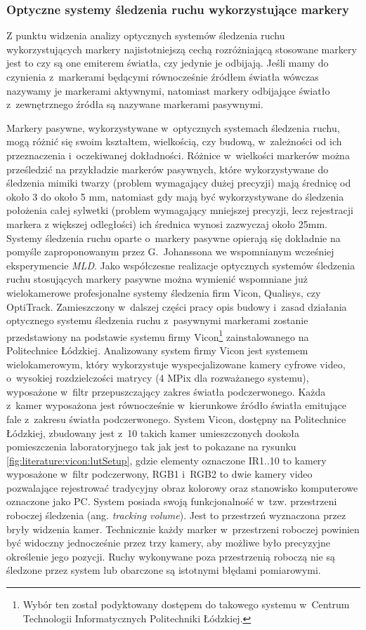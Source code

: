 \subsubsection*{Optyczne systemy śledzenia ruchu wykorzystujące markery}
Z punktu widzenia analizy optycznych systemów śledzenia ruchu wykorzystujących markery najistotniejszą cechą rozróżniającą stosowane markery jest to czy są one emiterem światła, czy jedynie je odbijają. Jeśli mamy do czynienia z~markerami będącymi równocześnie źródłem światła wówczas nazywamy je markerami aktywnymi, natomiast markery odbijające światło z~zewnętrznego źródła są nazywane markerami pasywnymi.

Markery pasywne, wykorzystywane w~optycznych systemach śledzenia ruchu, mogą różnić się swoim kształtem, wielkością, czy budową, w~zależności od ich przeznaczenia i~oczekiwanej dokładności. Różnice w~wielkości markerów można prześledzić na przykładzie markerów pasywnych, które wykorzystywane do śledzenia mimiki twarzy (problem wymagający dużej precyzji) mają średnicę od około 3 do około 5 mm, natomiast gdy mają być wykorzystywane do śledzenia położenia całej sylwetki (problem wymagający mniejszej precyzji, lecz rejestracji markera z większej odległości) ich średnica wynosi zazwyczaj około 25mm{}. Systemy śledzenia ruchu oparte o~markery pasywne opierają się dokładnie na pomyśle zaproponowanym przez G.~Johanssona we wspomnianym wcześniej eksperymencie \textsl{MLD}. Jako współczesne realizacje optycznych systemów śledzenia ruchu stosujących markery pasywne można wymienić wspomniane już wielokamerowe profesjonalne systemy śledzenia firm Vicon, Qualisys, czy OptiTrack. 
Zamieszczony w~dalszej części pracy opis budowy i~zasad działania optycznego systemu śledzenia ruchu z~pasywnymi markerami zostanie przedstawiony na podstawie systemu firmy Vicon\footnote{Wybór ten został podyktowany dostępem do takowego systemu w~Centrum Technologii Informatycznych Politechniki Łódzkiej.} zainstalowanego na Politechnice Łódzkiej. 
Analizowany system firmy Vicon jest systemem wielokamerowym, który wykorzystuje wyspecjalizowane kamery cyfrowe video, o~wysokiej rozdzielczości matrycy (4 MPix dla rozważanego systemu), wyposażone w~filtr przepuszczający zakres światła podczerwonego. Każda z~kamer wyposażona jest równocześnie w~kierunkowe źródło światła emitujące fale z~zakresu światła podczerwonego. System Vicon, dostępny na Politechnice Łódzkiej, zbudowany jest z~10 takich kamer umieszczonych dookoła pomieszczenia laboratoryjnego tak jak jest to pokazane na rysunku \ref{fig:literature:vicon:lutSetup}, gdzie elementy oznaczone IR1..10 to kamery wyposażone w~filtr podczerwony, RGB1 i~RGB2 to dwie kamery video pozwalające rejestrować tradycyjny obraz kolorowy oraz stanowisko komputerowe oznaczone jako PC. System posiada swoją funkcjonalność w~tzw. przestrzeni roboczej śledzenia (ang. \textsl{tracking volume}). Jest to przestrzeń wyznaczona przez bryły widzenia kamer. Technicznie każdy marker w~przestrzeni roboczej powinien być widoczny jednocześnie przez trzy kamery, aby możliwe było precyzyjne określenie jego pozycji. Ruchy wykonywane poza przestrzenią roboczą nie są śledzone przez system lub obarczone są istotnymi błędami pomiarowymi.

